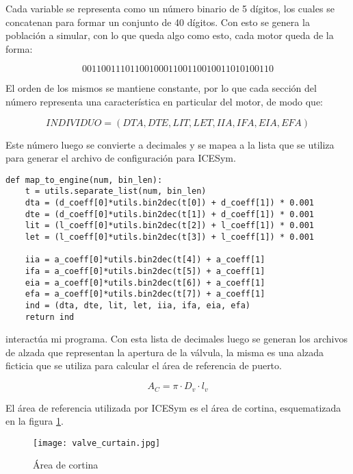 Cada variable se representa como un número binario de 5 dígitos, los cuales se
concatenan para formar un conjunto de 40 dígitos.
%
Con esto se genera la población a simular, con lo que queda algo como esto, cada
motor queda de la forma:

\begin{equation}
  0011001110110010001100110010011010100110 \nonumber
\end{equation}

El orden de los mismos se mantiene constante, por lo que cada sección del número
representa una característica en particular del motor, de modo que:

\begin{equation}
    INDIVIDUO = (DTA, DTE, LIT, LET, IIA, IFA, EIA, EFA) \nonumber
\end{equation}

Este número luego se convierte a decimales y se mapea a la lista que se utiliza
para generar el archivo de configuración para ICESym.
%
\begin{verbatim}
def map_to_engine(num, bin_len):
    t = utils.separate_list(num, bin_len)
    dta = (d_coeff[0]*utils.bin2dec(t[0]) + d_coeff[1]) * 0.001
    dte = (d_coeff[0]*utils.bin2dec(t[1]) + d_coeff[1]) * 0.001
    lit = (l_coeff[0]*utils.bin2dec(t[2]) + l_coeff[1]) * 0.001
    let = (l_coeff[0]*utils.bin2dec(t[3]) + l_coeff[1]) * 0.001

    iia = a_coeff[0]*utils.bin2dec(t[4]) + a_coeff[1]
    ifa = a_coeff[0]*utils.bin2dec(t[5]) + a_coeff[1]
    eia = a_coeff[0]*utils.bin2dec(t[6]) + a_coeff[1]
    efa = a_coeff[0]*utils.bin2dec(t[7]) + a_coeff[1]
    ind = (dta, dte, lit, let, iia, ifa, eia, efa)
    return ind
\end{verbatim}

interactúa mi programa.  Con esta lista de decimales luego se generan los
archivos de alzada que representan la apertura de la válvula, la misma es una
alzada ficticia que se utiliza para calcular el área de referencia de puerto.

\begin{equation}
  A_{C} = \pi \cdot D_{v}\cdot l_{v}
\end{equation}

El área de referencia utilizada por ICESym es el área de cortina, esquematizada
en la figura \ref{fig:area_cortina}.

\begin{figure}
  \centering
  \texttt{[image: valve\_curtain.jpg]}
  \caption{Área de cortina}
  \label{fig:area_cortina}
\end{figure}

